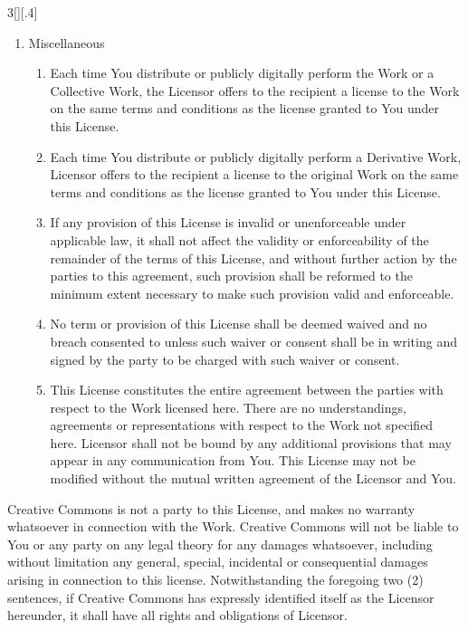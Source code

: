 \documentclass[8pt,a4paper]{article}
\begin{document}
\begin{multicols}{3}[][.4\paperwidth]
\begin{enumerate}
\begin{enumerate}
  \end{enumerate}


  \item Miscellaneous

  \begin{enumerate}

  \item Each time You distribute or publicly digitally perform the Work or a
        Collective Work, the Licensor offers to the recipient a license to the
        Work on the same terms and conditions as the license granted to You under
        this License.
  \item Each time You distribute or publicly digitally perform a Derivative Work,
        Licensor offers to the recipient a license to the original Work on the
        same terms and conditions as the license granted to You under this
        License.
  \item If any provision of this License is invalid or unenforceable under
        applicable law, it shall not affect the validity or enforceability of the
        remainder of the terms of this License, and without further action by the
        parties to this agreement, such provision shall be reformed to the
        minimum extent necessary to make such provision valid and enforceable.
  \item No term or provision of this License shall be deemed waived and no breach
        consented to unless such waiver or consent shall be in writing and signed
        by the party to be charged with such waiver or consent.
  \item This License constitutes the entire agreement between the parties with
        respect to the Work licensed here. There are no understandings,
        agreements or representations with respect to the Work not specified
        here. Licensor shall not be bound by any additional provisions that may
        appear in any communication from You. This License may not be modified
        without the mutual written agreement of the Licensor and You.

  \end{enumerate}

\end{enumerate}

\smallskip

Creative Commons is not a party to this License, and makes no warranty
whatsoever in connection with the Work. Creative Commons will not be liable to
You or any party on any legal theory for any damages whatsoever, including
without limitation any general, special, incidental or consequential damages
arising in connection to this license. Notwithstanding the foregoing two (2)
sentences, if Creative Commons has expressly identified itself as the Licensor
hereunder, it shall have all rights and obligations of Licensor.


\end{multicols}
\end{document}
